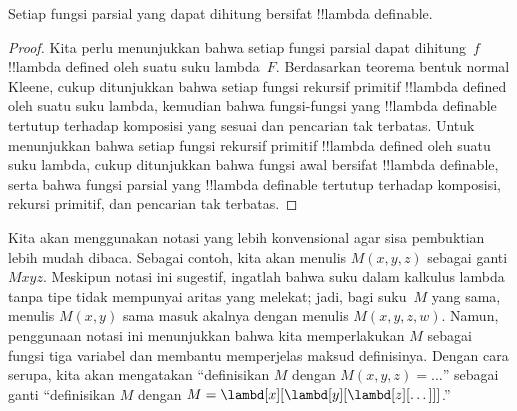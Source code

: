 \documentclass[../../../include/open-logic-section]{subfiles}
\begin{document}

\begin{thm}
Setiap fungsi parsial yang dapat dihitung bersifat !!{lambda definable}.
\end{thm}

\begin{proof}
Kita perlu menunjukkan bahwa setiap fungsi parsial dapat dihitung~$f$
!!{lambda defined} oleh suatu suku lambda~$F$. Berdasarkan teorema bentuk
normal Kleene, cukup ditunjukkan bahwa setiap fungsi rekursif primitif
!!{lambda defined} oleh suatu suku lambda, kemudian bahwa fungsi-fungsi yang
!!{lambda definable} tertutup terhadap komposisi yang sesuai dan pencarian tak
terbatas. Untuk menunjukkan bahwa setiap fungsi rekursif primitif
!!{lambda defined} oleh suatu suku lambda, cukup ditunjukkan bahwa fungsi
awal bersifat !!{lambda definable}, serta bahwa fungsi parsial yang
!!{lambda definable} tertutup terhadap komposisi, rekursi primitif, dan
pencarian tak terbatas.
\end{proof}

Kita akan menggunakan notasi yang lebih konvensional agar sisa pembuktian lebih
mudah dibaca. Sebagai contoh, kita akan menulis $M(x,y,z)$ sebagai ganti
$Mxyz$. Meskipun notasi ini sugestif, ingatlah bahwa suku dalam kalkulus lambda
tanpa tipe tidak mempunyai aritas yang melekat; jadi, bagi suku~$M$ yang sama,
menulis $M(x,y)$ sama masuk akalnya dengan menulis $M(x,y,z,w)$. Namun,
penggunaan notasi ini menunjukkan bahwa kita memperlakukan $M$ sebagai fungsi
tiga variabel dan membantu memperjelas maksud definisinya. Dengan cara serupa,
kita akan mengatakan ``definisikan $M$ dengan $M(x,y,z)=\dots$'' sebagai ganti
``definisikan $M$ dengan $M=\lambd[x][\lambd[y][\lambd[z][\dots]]]$.''
\end{document}
